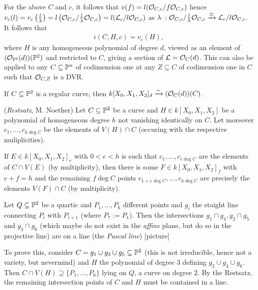 \documentclass[a4paper,parskip=half,numbers=enddot, DIV=12]{scrreprt}
\begin{document}
For the above $C$ and $c$, it follows that $v(f) = l(\mathcal{O}_{C,c}/f\mathcal{O}_{C,c})$ hence
$v_c(l) = v_c\left(\frac l\lambda\right) = l\left(\mathcal{O}_{C,c}/\frac l\lambda\mathcal{O}_{C,c}\right)
=l(\mathcal{L}_c/l\mathcal{O}_{C,c})$ as $\lambda\cdot : \mathcal{O}_{C,c}/\frac l\lambda \mathcal{O}_{C,c}\xrightarrow\cong \mathcal{L}_c/l\mathcal{O}_{C,c}$.
It follows that
\begin{align*}%
i(C,H,c) = v_c(H),
\end{align*}
where $H$ is any homogeneous polynomial of degree $d$, viewed as an element of
$(\mathcal{O}_{\mathbb{P}^2}(d))(\mathbb{P}^2)$ and restricted to $C$, giving a section
of $\mathcal{L} = \mathcal{O}_C(d)$.
This can also be applied to any $C\subseteq \mathbb{P}^n$ of codimension one at any $Z\subseteq C$ of codimension one in $C$ such that
$\mathcal{O}_{C,Z}$ is a DVR.
\begin{thm}
\begin{alphanumerate}
\item If $C\subseteq \mathbb{P}^2$ is a regular curve, then $k[X_0,X_1,X_2]_d\xrightarrow\sim (\mathcal{O}_C(d))(C)$.
\item (\emph{Restsatz}, M. Noether) Let $C\subseteq \mathbb{P}^2$ be a curve and $H\in k[X_0,X_1,X_2]$ be a polynomial of homogeneous degree $h$
not vanishing identically on $C$. Let moreover $c_1,\dotsc,c_{h\deg C}$ be the elements of $V(H)\cap C$ (occuring with the respective muliplicities).

If $E\in k[X_0,X_1,X_2]_e$ with $0<e<h$ is such that $c_1,\dotsc,c_{e\deg C}$ are the elements of $C\cap V(E)$ (by multiplicity),
then there is some $F\in k[X_0,X_1,X_2]_f$ with $e+f=h$
and the remaining $f\deg C$ points $c_{1+e\deg C},\dotsc, c_{h\deg C}$ are precisely the elements $V(F)\cap C$ (by multiplicity).
\end{alphanumerate}
\end{thm}
\begin{example*}
Let $Q\subseteq \mathbb{P}^2$ be a quartic and $P_1,\dotsc,P_6$ different points and $g_i$ the staight line connecting
$P_i$ with $P_{i+1}$ (where $P_7 := P_1$).
Then the intersections $g_1\cap g_4, g_2\cap g_5$ and $g_3\cap g_6$ (which maybe do not exist in the \emph{affine} plane,
but do so in the projective line)  are on a line (the \emph{Pascal line})
[picture]

To prove this, consider $C=g_1\cup g_3\cup g_5\subseteq \mathbb{P}^2$ (this is not irreducible, hence not a variety, but nevermind)
and $H$ the polynomial of degree $3$ defining $g_2\cup g_4\cup g_6$.
Then $C\cap V(H) \supseteq \{P_1,\dotsc,P_6\}$ lying on $Q$, a curve on degree $2$.
By the Restsatz, the remaining intersection points of $C$ and $H$ must be contained in a line.
\end{example*}
\end{document}
